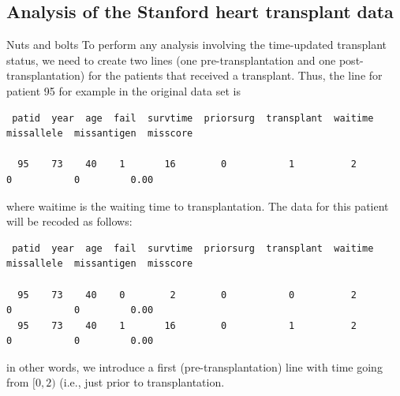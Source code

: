 \documentclass[envcountsect, 10pt, portrait, palatino]{beamer}
\begin{document}
\subsection{Analysis of the Stanford heart transplant data}
\begin{frame}[fragile]{Nuts and bolts}
To perform any analysis involving the time-updated transplant status, we need to create two lines (one pre-transplantation and one post-transplantation) for the patients that received a transplant.  Thus, the line for patient 95 for example in the original data set is

\tiny
\begin{verbatim}
 patid  year  age  fail  survtime  priorsurg  transplant  waitime  missallele  missantigen  misscore

  95    73    40    1       16        0           1          2         0           0         0.00

\end{verbatim}
\normalsize
where \textsf{waitime} is the waiting time to transplantation.  The data for this patient will be recoded as follows:
\tiny
\begin{verbatim}
 patid  year  age  fail  survtime  priorsurg  transplant  waitime  missallele  missantigen  misscore

  95    73    40    0        2        0           0          2         0           0         0.00
  95    73    40    1       16        0           1          2         0           0         0.00
\end{verbatim}
\normalsize
in other words, we introduce a first (pre-transplantation) line with time going from $[0, 2)$ (i.e., just prior to transplantation.
\end{frame} 
\end{document}
